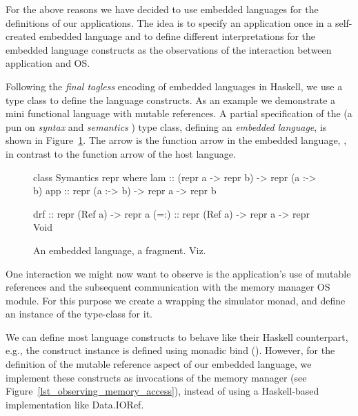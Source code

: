 For the above reasons we have decided to use embedded languages for the definitions of our applications.
The idea is to specify an application once in a self-created embedded language and to define different interpretations for the embedded language constructs as the observations of the interaction between application and OS\nolinebreak[3]  \cite{Hofer:2008:PED:1449913.1449935}.

Following the \emph{final tagless} \cite{final_tagless_embedding} encoding of embedded languages in Haskell, we use a type class to define the language constructs.
As an example we demonstrate a mini functional language with mutable references.
A partial specification of the  (a pun on \emph{syntax} and \emph{semantics} \cite{final_tagless_embedding}) type class, defining an \emph{embedded language}, is shown in Figure~\ref{fig:embedded_language_interface}.
The arrow \hs{:->} is the function arrow in the embedded language, \eg {}, in contrast to the function arrow \hs{->} of the host language.

\begin{figure}
\begin{code}
class Symantics repr where
  lam   :: (repr a -> repr b) -> repr (a :-> b)
  app   :: repr (a :-> b) -> repr a -> repr b

  drf   :: repr (Ref a) -> repr a
  (=:)  :: repr (Ref a) -> repr a -> repr Void
\end{code}
\vspace{-0.5em}
\caption{An embedded language, a fragment. Viz.~\cite{final_tagless_embedding}}
\vspace{-1em}
\label{fig:embedded_language_interface}
\end{figure}

One interaction we might now want to observe is the application's use of mutable references and the subsequent communication with the memory manager OS module.
For this purpose we create a  wrapping the simulator monad, and define an instance of the  type-class for it.

We can define most language constructs to behave like their Haskell counterpart, e.g., the  construct instance is defined using monadic bind (\hs{>>=}\xspace).
However, for the definition of the mutable reference aspect of our embedded language, we implement these constructs as invocations of the memory manager (see Figure~\ref{lst_observing_memory_access}),
instead of using a Haskell-based implementation like \textsf{Data.IORef}.

